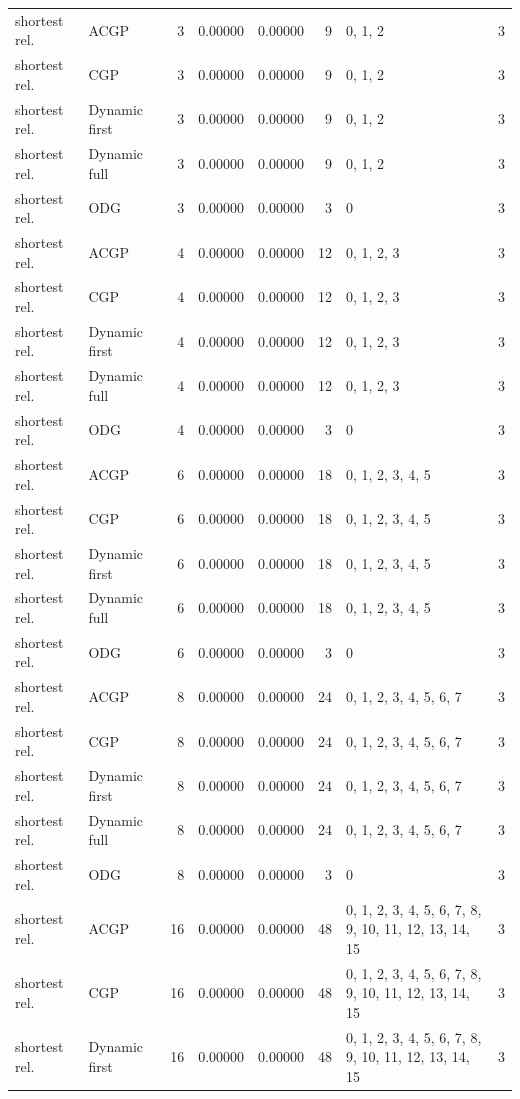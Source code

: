 \documentclass[10pt,a4paper]{article}
\begin{document}
\begin{longtable}{@{}p{23mm}p{29mm}rrrrp{36mm}r@{}}
shortest rel. & ACGP & 3 & 0.00000 & 0.00000 & 9 & 0, 1, 2 & 3 \\
shortest rel. & CGP & 3 & 0.00000 & 0.00000 & 9 & 0, 1, 2 & 3 \\
shortest rel. & Dynamic first & 3 & 0.00000 & 0.00000 & 9 & 0, 1, 2 & 3 \\
shortest rel. & Dynamic full & 3 & 0.00000 & 0.00000 & 9 & 0, 1, 2 & 3 \\
shortest rel. & ODG & 3 & 0.00000 & 0.00000 & 3 & 0 & 3 \\
shortest rel. & ACGP & 4 & 0.00000 & 0.00000 & 12 & 0, 1, 2, 3 & 3 \\
shortest rel. & CGP & 4 & 0.00000 & 0.00000 & 12 & 0, 1, 2, 3 & 3 \\
shortest rel. & Dynamic first & 4 & 0.00000 & 0.00000 & 12 & 0, 1, 2, 3 & 3 \\
shortest rel. & Dynamic full & 4 & 0.00000 & 0.00000 & 12 & 0, 1, 2, 3 & 3 \\
shortest rel. & ODG & 4 & 0.00000 & 0.00000 & 3 & 0 & 3 \\
shortest rel. & ACGP & 6 & 0.00000 & 0.00000 & 18 & 0, 1, 2, 3, 4, 5 & 3 \\
shortest rel. & CGP & 6 & 0.00000 & 0.00000 & 18 & 0, 1, 2, 3, 4, 5 & 3 \\
shortest rel. & Dynamic first & 6 & 0.00000 & 0.00000 & 18 & 0, 1, 2, 3, 4, 5 & 3 \\
shortest rel. & Dynamic full & 6 & 0.00000 & 0.00000 & 18 & 0, 1, 2, 3, 4, 5 & 3 \\
shortest rel. & ODG & 6 & 0.00000 & 0.00000 & 3 & 0 & 3 \\
shortest rel. & ACGP & 8 & 0.00000 & 0.00000 & 24 & 0, 1, 2, 3, 4, 5, 6, 7 & 3 \\
shortest rel. & CGP & 8 & 0.00000 & 0.00000 & 24 & 0, 1, 2, 3, 4, 5, 6, 7 & 3 \\
shortest rel. & Dynamic first & 8 & 0.00000 & 0.00000 & 24 & 0, 1, 2, 3, 4, 5, 6, 7 & 3 \\
shortest rel. & Dynamic full & 8 & 0.00000 & 0.00000 & 24 & 0, 1, 2, 3, 4, 5, 6, 7 & 3 \\
shortest rel. & ODG & 8 & 0.00000 & 0.00000 & 3 & 0 & 3 \\
shortest rel. & ACGP & 16 & 0.00000 & 0.00000 & 48 & 0, 1, 2, 3, 4, 5, 6, 7, 8, 9, 10, 11, 12, 13, 14, 15 & 3 \\
shortest rel. & CGP & 16 & 0.00000 & 0.00000 & 48 & 0, 1, 2, 3, 4, 5, 6, 7, 8, 9, 10, 11, 12, 13, 14, 15 & 3 \\
shortest rel. & Dynamic first & 16 & 0.00000 & 0.00000 & 48 & 0, 1, 2, 3, 4, 5, 6, 7, 8, 9, 10, 11, 12, 13, 14, 15 & 3 \\

\end{longtable}
\end{document}
